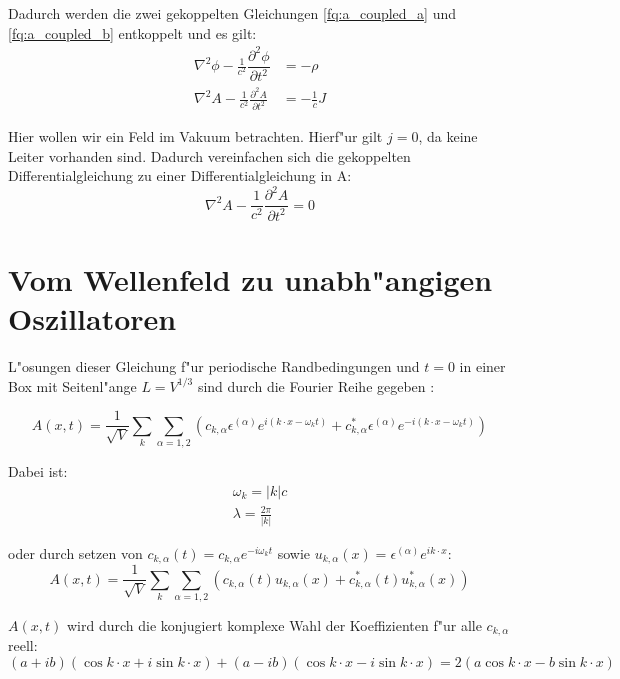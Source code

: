 Dadurch werden die zwei gekoppelten Gleichungen \ref{fq:a_coupled_a} und \ref{fq:a_coupled_b} entkoppelt und es gilt:
\begin{align}
\nabla^2 \phi - \frac{1}{c^2} \dfrac{\partial^2 \phi}{\partial t^2} &= -\rho \\
\nabla^2 A - \frac{1}{c^2} \frac{\partial^2 A }{\partial t^2} &= - \frac{1}{c} J
\end{align}

Hier wollen wir ein Feld im Vakuum betrachten. Hierf"ur gilt $j = 0$, da keine Leiter vorhanden sind.
Dadurch vereinfachen sich die gekoppelten Differentialgleichung zu einer Differentialgleichung in A:
\begin{equation} \label{fq:wave_dgl}
\nabla^2 A - \frac{1}{c^2} \frac{\partial^2 A }{\partial t^2} = 0
\end{equation}

\section{Vom Wellenfeld zu unabh"angigen Oszillatoren}
L"osungen dieser Gleichung f"ur periodische Randbedingungen und $t=0$ in einer Box mit Seitenl"ange $L = V^{1/3}$ sind durch die Fourier Reihe gegeben \cite{fq:em_wave_eq}:

\begin{equation} \label{fq:wave_eq}
A(x,t) = \frac{1}{\sqrt{V}} \sum_k \sum_{\alpha=1,2} (c_{k,\alpha} \epsilon^{(\alpha)} e^{i (k \cdot x - \omega_k t)} + c^*_{k,\alpha} \epsilon^{(\alpha)} e^{-i(k \cdot x - \omega_k t)})
\end{equation}

Dabei ist:
\begin{align}
\omega_k=|k|c \\
\lambda = \frac{2 \pi}{|k|}
\end{align}

oder durch setzen von $c_{k,\alpha}(t) = c_{k,\alpha} e^{-i \omega_k t}$ sowie $u_{k,\alpha}(x) = \epsilon^{(\alpha)} e^{ik \cdot x}$:
\begin{equation}
A(x,t) = \frac{1}{\sqrt{V}} \sum_k \sum_{\alpha=1,2} (c_{k,\alpha}(t)u_{k,\alpha}(x) + c^*_{k,\alpha}(t) u^*_{k,\alpha}(x))
\end{equation}

$A(x,t)$ wird durch die konjugiert komplexe Wahl der Koeffizienten f"ur alle $c_{k,\alpha}$ reell:
\begin{equation}
(a + ib)(\cos k \cdot x + i \sin k \cdot x ) + (a - ib)(\cos k \cdot x - i \sin k \cdot x ) = 2 ( a \cos k \cdot x - b \sin k \cdot x )
\end{equation}

